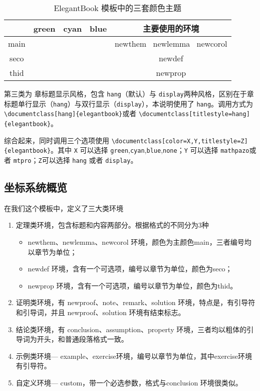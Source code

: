 \documentclass[color=green,mathpazo,titlestyle=hang]{elegantbook}
\begin{document}
\begin{table}[htp]
\centering
\begin{tabular}{ccccc}
\toprule	
	  & green & cyan & blue & 主要使用的环境\\
\midrule
main & \makecell{{\color{main1}\rule{1cm}{1cm}}}& \makecell{{\color{main2}\rule{1cm}{1cm}}}&\makecell{ {\color{main3}\rule{1cm}{1cm}}}& newthem \ newlemma \ newcorol\\

seco &\makecell{ {\color{seco1}\rule{1cm}{1cm}}}& \makecell{{\color{seco2}\rule{1cm}{1cm}}}&\makecell{ {\color{seco3}\rule{1cm}{1cm}}}&newdef\\

thid &\makecell{ {\color{thid1}\rule{1cm}{1cm}}}& \makecell{{\color{thid2}\rule{1cm}{1cm}}}&\makecell{ {\color{thid3}\rule{1cm}{1cm}}}&newprop\\
\bottomrule
\end{tabular}
\caption{ElegantBook 模板中的三套颜色主题\label{tab:color thm}}
\end{table}

第三类为{\color{main} 章标题显示风格}，包含 \verb|hang|（默认）与 \verb|display|两种风格，区别在于章标题单行显示（\verb|hang|）与双行显示（\verb|display|），本说明使用了 \verb|hang|。调用方式为 \verb|\documentclass[hang]{elegantbook}|或者 \verb|\documentclass[titlestyle=hang]{elegantbook}|。

综合起来，同时调用三个选项使用 \verb|\documentclass[color=X,Y,titlestyle=Z]{elegantbook}|。其中 \verb|X| 可以选择 \verb|green|,\verb|cyan|,\verb|blue|,\verb|none|；\verb|Y| 可以选择 \verb|mathpazo|或者 \verb|mtpro|；\verb|Z|可以选择 \verb|hang| 或者 \verb|display|。

\subsection{坐标系统概览}
在我们这个模板中，定义了三大类环境
\begin{enumerate}
\item 定理类环境，包含标题和内容两部分。根据格式的不同分为3种
\begin{itemize}
\item {\color{main} newthem、newlemma、newcorol} 环境，颜色为主颜色main，三者编号均以章节为单位；
\item {\color{main} newdef} 环境，含有一个可选项，编号以章节为单位，颜色为seco；
\item {\color{main} newprop} 环境，含有一个可选项，编号以章节为单位，颜色为thid。
\end{itemize}
\item 证明类环境，有  {\color{main} newproof、note、remark、solution} 环境，特点是，有引导符和引导词，并且 newproof、solution 环境有结束标志。
\item 结论类环境，有 {\color{main}  conclusion、assumption、property} 环境，三者均以粗体的引导词为开头，和普通段落格式一致。
\item 示例类环境--- {\color{main} example、exercise}环境，编号以章节为单位，其中exercise环境有引导符。
\item 自定义环境--- {\color{main} custom}，带一个必选参数，格式与conclusion 环境很类似。
\end{enumerate}
\end{document}
